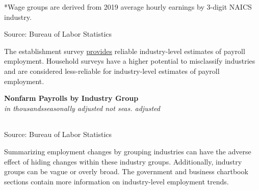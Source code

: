 \documentclass{report}
\newcommand{\tbllink}[1]{\href{https://raw.githubusercontent.com/bdecon/US-chartbook/master/chartbook/data/#1}{\faTable}}
\begin{document}
{\begin{minipage}{0.76\textwidth}
\footnotesize{*Wage groups are derived from 2019 average hourly earnings by 3-digit NAICS industry. }
\vspace*{-1mm}

\footnotesize{Source: Bureau of Labor Statistics} \hfill \tbllink{jobs_tercile.csv}
\end{minipage}
\newpage
\begin{minipage}{0.76\textwidth}    
\small The establishment survey \href{https://www.bls.gov/news.release/empsit.t17.htm}{provides} reliable industry-level estimates of payroll employment. Household surveys have a higher potential to misclassify industries and are considered less-reliable for industry-level estimates of payroll employment.


\end{minipage}
\vspace{2mm}

\begin{minipage}{0.83\textwidth}
\normalsize \textbf{Nonfarm Payrolls by Industry Group}\\
\footnotesize{\textit{in thousands\hspace{35mm}seasonally adjusted \hspace{29mm} not seas. adjusted}}
\vspace{-6mm}

\hspace*{-3mm}  \setlength{\tabcolsep}{3.6pt} \color{black!90}
		{\renewcommand{\arraystretch}{1.55}
		 \begin{tabular}{p{45mm} R{12.8mm} R{10.8mm} R{10.6mm} R{10.6mm} 
		   | R{12.0mm} R{10.6mm}}
			  \hline
		\end{tabular}}
\vspace{-3mm}

\footnotesize{Source: Bureau of Labor Statistics} \hfill \tbllink{ces_data.csv}
\end{minipage}
\vspace{3mm}

\begin{minipage}{0.76\textwidth}
\small Summarizing employment changes by grouping industries can have the adverse effect of hiding changes within these industry groups. Additionally, industry groups can be vague or overly broad. The government and business chartbook sections contain more information on industry-level employment trends. 
\end{minipage}
\newpage
\vspace*{-10mm} \hypertarget{epoplt}{}

}
\end{document}

